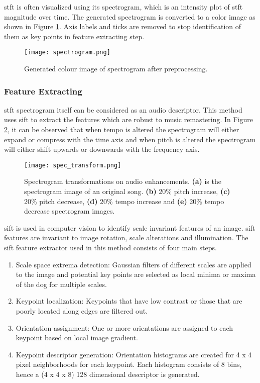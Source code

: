 \ac{stft} is often visualized using its spectrogram\cite{Kehtarnavaz2008}, which is an intensity plot of \ac{stft} magnitude over time. 
The generated spectrogram is converted to a color image as shown in Figure \ref{fig:spectrogram}. Axis labels and ticks are removed to stop
identification of them as key points in feature extracting step. 

\begin{figure}[H]
  \centering
  \texttt{[image: spectrogram.png]}
  \caption{Generated colour image of spectrogram after preprocessing.}
  \label{fig:spectrogram}
\end{figure}

\subsubsection{Feature Extracting}

\ac{stft} spectrogram itself can be considered as an audio descriptor\cite{Ke2005}. This method uses \ac{sift}\cite{Lowe2004} to extract 
the features which are robust to music remastering. In Figure \ref{fig:compare_spectrogram}, it can be observed that when tempo is
altered the spectrogram will either expand or compress with the time axis and when pitch is altered the spectrogram will either shift upwards or 
downwards with the frequency axis. 

\begin{figure}[H]
  \centering
  \texttt{[image: spec\_transform.png]}
  \caption{Spectrogram transformations on audio enhancements. \textbf{(a)} is the spectrogram image of an original song. \textbf{(b)} 20\% 
  pitch increase, \textbf{(c)} 20\% pitch decrease, \textbf{(d)} 20\% tempo increase and \textbf{(e)} 20\% tempo decrease spectrogram images.}
  \label{fig:compare_spectrogram}
\end{figure}

\ac{sift} is used in computer vision to identify scale invariant features of an image. \ac{sift} features are invariant to image rotation,
scale alterations and illumination\cite{Lowe2004}. The \ac{sift} feature extractor used in this method consists of four main steps.
\begin{enumerate}
  \item Scale space extrema detection: Gaussian filters of different scales are applied to the image and potential key points are selected
  as local minima or maxima of the \ac{dog} for multiple scales.
  \item Keypoint localization: Keypoints that have low contrast or those that are poorly located along edges
  are filtered out.
  \item Orientation assignment: One or more orientations are assigned to each keypoint based on local image gradient. 
  \item Keypoint descriptor generation: Orientation histograms are created for 4 x 4 pixel neighborhoods for each keypoint.
  Each histogram consists of 8 bins, hence a (4 x 4 x 8) 128 dimensional descriptor is generated.
\end{enumerate}

